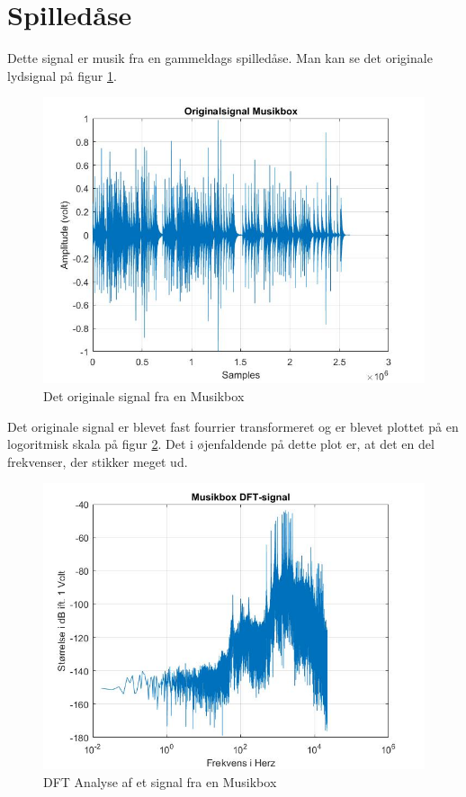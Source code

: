 \section{Spilledåse}
Dette signal er musik fra en gammeldags spilledåse. Man kan se det originale lydsignal på figur \ref{fig:Musikbox original}.
\begin{figure}[H]
	\centering
	\includegraphics[width=140mm]{figures/Musikbox/original.jpg}
	\caption{Det originale signal fra en Musikbox}
	\label{fig:Musikbox original}
\end{figure}

Det originale signal er blevet fast fourrier transformeret og er blevet plottet på en logoritmisk skala på figur \ref{fig:Musikbox DFT}. Det i øjenfaldende på dette plot er, at det en del frekvenser, der stikker meget ud.
\begin{figure}[H]
	\centering
	\includegraphics[width=140mm]{figures/Musikbox/DFT.jpg}
	\caption{DFT Analyse af et signal fra en Musikbox}
	\label{fig:Musikbox DFT}
\end{figure}

